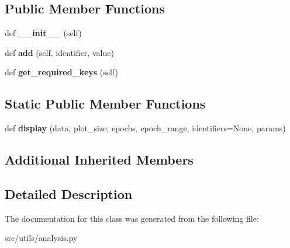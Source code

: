\subsection*{Public Member Functions}
\begin{DoxyCompactItemize}
\item 
def {\bfseries \+\_\+\+\_\+init\+\_\+\+\_\+} (self)\hypertarget{classanalysis_1_1LatentStateData_ae0c63041952aeeee67a23ed3810f58cf}{}\label{classanalysis_1_1LatentStateData_ae0c63041952aeeee67a23ed3810f58cf}

\item 
def {\bfseries add} (self, identifier, value)\hypertarget{classanalysis_1_1LatentStateData_abe6ae250f7eb3e9304028802fafd7f95}{}\label{classanalysis_1_1LatentStateData_abe6ae250f7eb3e9304028802fafd7f95}

\item 
def {\bfseries get\+\_\+required\+\_\+keys} (self)\hypertarget{classanalysis_1_1LatentStateData_a95d8c3a35253120463d77c2a1931b45e}{}\label{classanalysis_1_1LatentStateData_a95d8c3a35253120463d77c2a1931b45e}

\end{DoxyCompactItemize}
\subsection*{Static Public Member Functions}
\begin{DoxyCompactItemize}
\item 
def {\bfseries display} (data, plot\+\_\+size, epochs, epoch\+\_\+range, identifiers=None, params)\hypertarget{classanalysis_1_1LatentStateData_a037196cb9796998eac40d664c1a1788f}{}\label{classanalysis_1_1LatentStateData_a037196cb9796998eac40d664c1a1788f}

\end{DoxyCompactItemize}
\subsection*{Additional Inherited Members}


\subsection{Detailed Description}
\begin{DoxyVerb}\end{DoxyVerb}
 

The documentation for this class was generated from the following file\+:\begin{DoxyCompactItemize}
\item 
src/utils/analysis.\+py\end{DoxyCompactItemize}

